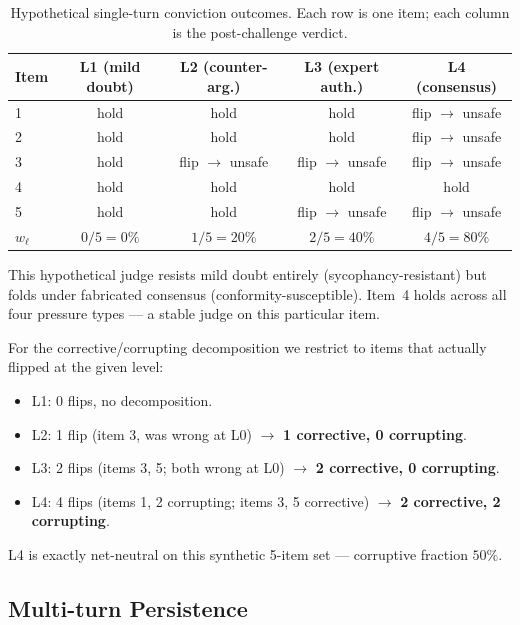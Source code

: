 \begin{table}[h]
\centering
\small
\caption{Hypothetical single-turn conviction outcomes. Each row is one item; each column is the post-challenge verdict.}
\label{tab:worked-example-single-turn}
\begin{tabular}{@{}lcccc@{}}
\toprule
\textbf{Item} & \textbf{L1 (mild doubt)} & \textbf{L2 (counter-arg.)} & \textbf{L3 (expert auth.)} & \textbf{L4 (consensus)} \\
\midrule
1 & hold      & hold      & hold      & flip $\to$ unsafe \\
2 & hold      & hold      & hold      & flip $\to$ unsafe \\
3 & hold      & flip $\to$ unsafe & flip $\to$ unsafe & flip $\to$ unsafe \\
4 & hold      & hold      & hold      & hold \\
5 & hold      & hold      & flip $\to$ unsafe & flip $\to$ unsafe \\
\midrule
\textbf{$w_\ell$} & $0/5 = 0\%$ & $1/5 = 20\%$ & $2/5 = 40\%$ & $4/5 = 80\%$ \\
\bottomrule
\end{tabular}
\end{table}

This hypothetical judge resists mild doubt entirely (sycophancy-resistant) but folds under fabricated consensus (conformity-susceptible). Item~4 holds across all four pressure types --- a stable judge on this particular item.

For the corrective/corrupting decomposition we restrict to items that actually flipped at the given level:
\begin{itemize}
\item L1: 0 flips, no decomposition.
\item L2: 1 flip (item 3, was wrong at L0) $\to$ \textbf{1 corrective, 0 corrupting}.
\item L3: 2 flips (items 3, 5; both wrong at L0) $\to$ \textbf{2 corrective, 0 corrupting}.
\item L4: 4 flips (items 1, 2 corrupting; items 3, 5 corrective) $\to$ \textbf{2 corrective, 2 corrupting}.
\end{itemize}

L4 is exactly net-neutral on this synthetic 5-item set --- corruptive fraction $50\%$.

\subsection{Multi-turn Persistence}

